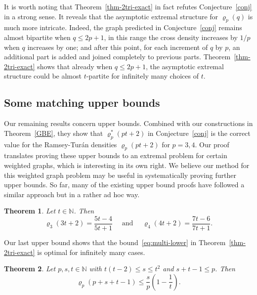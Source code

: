 \documentclass[10pt,a4paper]{article}
\newtheorem{theorem}{Theorem}[section]
\theoremstyle{definition}
\begin{document}
It is worth noting that Theorem~\ref{thm-2tri-exact} in fact refutes Conjecture~\ref{conj} in a strong sense. It reveals that the asymptotic extremal structure for $\varrho_p(q)$ is much more intricate. Indeed, the graph predicted in Conjecture~\ref{conj} remains almost bipartite when $q\le 2p+1$, in this range the cross density increases by $1/p$ when $q$ increases by one; and after this point, for each increment of $q$ by $p$, an additional part is added and joined completely to previous parts. Theorem~\ref{thm-2tri-exact} shows that already when $q\le 2p+1$, the asymptotic extremal structure could be almost $t$-partite for infinitely many choices of $t$.



\subsection{Some matching upper bounds}
Our remaining results concern upper bounds. Combined with our constructions in Theorem~\ref{GBE}, they show that $\varrho_p^*(pt+2)$ in Conjecture~\ref{conj} is the correct value for the Ramsey-Tur\'an densities $\varrho_p(pt+2)$ for $p=3,4$. Our proof translates proving these upper bounds to an extremal problem for certain weighted graphs, which is interesting in its own right. We believe our method for this weighted graph problem may be useful in systematically proving further upper bounds. So far, many of the existing upper bound proofs have followed a similar approach but in a rather ad hoc way.


\begin{theorem}\label{thm-upper-main}
	Let $t\in\mathbb{N}$. Then
	$$\varrho_3(3t+2)=\frac{5t-4}{5t+1} \quad \mbox{ and }\quad \varrho_4(4t+2)=\frac{7t-6}{7t+1}.$$
\end{theorem}





Our last upper bound shows that the bound~\eqref{eq:multi-lower} in Theorem~\ref{thm-2tri-exact} is optimal for infinitely many cases.

\begin{theorem}\label{thm-upper-easy}
	Let $p,s,t\in\mathbb{N}$ with $t(t-2) \leq s \leq t^2$ and $s+t-1 \leq p$.
	Then 
	$$\varrho_p(p+s+t-1) \leq \frac{s}{p}\left(1-\frac{1}{t}\right).$$
\end{theorem}

\end{document}
